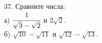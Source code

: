 37. Сравните числа:\\
а) $\cfrac{1}{\sqrt{3}-\sqrt{2}}$ и $2\sqrt{2}.$\\
б) $\sqrt{10}-\sqrt{11}$ и $\sqrt{12}-\sqrt{13}.$\\
